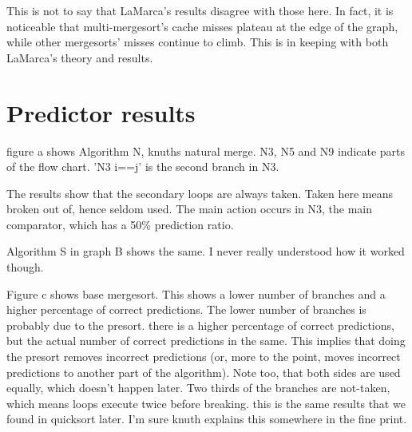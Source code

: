 This is not to say that LaMarca's results disagree with those here. In fact, it
is noticeable that multi-mergesort's cache misses plateau at the edge of the
graph, while other mergesorts' misses continue to climb. This is in keeping with
both LaMarca's theory and results.

\section{Predictor results}



figure a shows Algorithm N, knuths natural merge. N3, N5 and N9 indicate parts of the flow chart. 'N3 i==j' is the second branch in N3.

The results show that the secondary loops are always taken. Taken here means broken out of, hence seldom used. The main action occurs in N3, the main comparator, which has a 50\% prediction ratio.

Algorithm S in graph B shows the same. I never really understood how it worked though.



Figure c shows base mergesort. This shows a lower number of branches and a higher percentage of correct predictions. The lower number of branches is probably due to the presort. there is a higher percentage of correct predictions, but the actual number of correct predictions in the same. This implies that doing the presort removes incorrect predictions (or, more to the point, moves incorrect predictions to another part of the algorithm). Note too, that both sides are used equally, which doesn't happen later. Two thirds of the branches are not-taken, which means loops execute twice before breaking. this is the same results that we found in quicksort later. I'm sure knuth explains this somewhere in the fine print.

